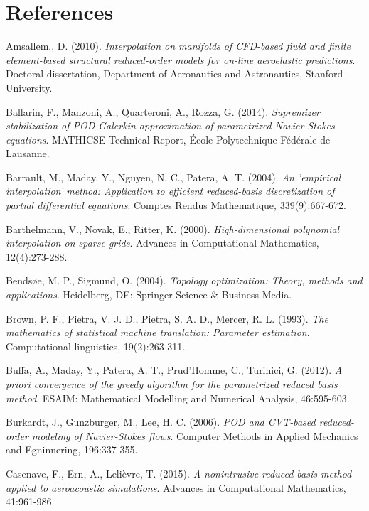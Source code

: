 \documentclass[longtitle]{elsarticle}
\numberwithin{equation}{section}
\theoremstyle{theorem}
\theoremstyle{definition}
\theoremstyle{remark}
\theoremstyle{proposition}
\numberwithin{figure}{section}
\begin{document}
	\section*{References}
		
	\begin{thebibliography}{50}
		
		Amsallem., D. (2010). \emph{Interpolation on manifolds of CFD-based fluid and finite element-based structural reduced-order models for on-line aeroelastic predictions}. Doctoral dissertation, Department of Aeronautics and Astronautics, Stanford University.
		
		Ballarin, F., Manzoni, A., Quarteroni, A., Rozza, G. (2014). \emph{Supremizer stabilization of POD-Galerkin approximation of parametrized Navier-Stokes equations}. MATHICSE Technical Report, \'Ecole Polytechnique F\'ed\'erale de Lausanne.
	
		Barrault, M., Maday, Y., Nguyen, N. C., Patera, A. T. (2004). \emph{An 'empirical interpolation' method: Application to efficient reduced-basis discretization of partial differential equations}. Comptes Rendus Mathematique, 339(9):667-672.
		
		Barthelmann, V., Novak, E., Ritter, K. (2000). \emph{High-dimensional polynomial interpolation on sparse grids}. Advances in Computational Mathematics, 12(4):273-288.
		
		Bends\o{}e, M. P., Sigmund, O. (2004). \emph{Topology optimization: Theory, methods and applications}. Heidelberg, DE: Springer Science \& Business Media. 
		
		Brown, P. F., Pietra, V. J. D., Pietra, S. A. D., Mercer, R. L. (1993). \emph{The mathematics of statistical machine translation: Parameter estimation}. Computational linguistics, 19(2):263-311.
		
		Buffa, A., Maday, Y., Patera, A. T., Prud'Homme, C., Turinici, G. (2012). \emph{A priori convergence of the greedy algorithm for the parametrized reduced basis method}. ESAIM: Mathematical Modelling and Numerical Analysis, 46:595-603.
		
		Burkardt, J., Gunzburger, M., Lee, H. C. (2006). \emph{POD and CVT-based reduced-order modeling of Navier-Stokes flows}. Computer Methods in Applied Mechanics and Egninnering, 196:337-355.
		
		Casenave, F., Ern, A., Lelièvre, T. (2015). \emph{A nonintrusive reduced basis method applied to aeroacoustic simulations}. Advances in Computational Mathematics, 41:961-986.
		

\end{thebibliography}
\end{document}
